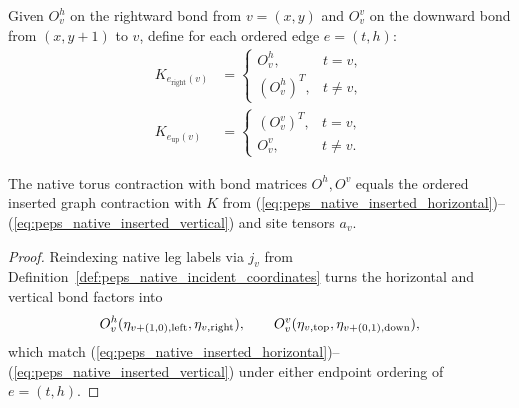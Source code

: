 \begin{definition}%
    \label{def:peps_native_inserted_matrices}
    \leanok
    Given $O^h_v$ on the rightward bond from $v=(x,y)$ and $O^v_v$ on the
    downward bond from $(x,y+1)$ to $v$, define for each ordered edge $e=(t,h)$:
    \begin{align}
        K_{e_{\mathrm{right}}(v)} & =
        \begin{cases}O^h_v,&t=v,\\(O^h_v)^T,&t\ne v,\end{cases}
        \label{eq:peps_native_inserted_horizontal} \\
        K_{e_{\mathrm{up}}(v)}    & =
        \begin{cases}(O^v_v)^T,&t=v,\\O^v_v,&t\ne v.\end{cases}
        \label{eq:peps_native_inserted_vertical}
    \end{align}
\end{definition}

\begin{lemma}%
    \label{thm:peps_native_inserted_network}
    \leanok
    The native torus contraction with bond matrices $O^h,O^v$ equals the ordered
    inserted graph contraction with $K$ from
    (\ref{eq:peps_native_inserted_horizontal})--(\ref{eq:peps_native_inserted_vertical})
    and site tensors $a_v$.
\end{lemma}
\begin{proof}\leanok
    Reindexing native leg labels via $j_v$ from
    Definition~\ref{def:peps_native_incident_coordinates} turns the horizontal
    and vertical bond factors into
    \begin{align}
        O^h_v(\eta_{v+(1,0),\mathrm{left}},\eta_{v,\mathrm{right}}),
        \qquad
        O^v_v(\eta_{v,\mathrm{top}},\eta_{v+(0,1),\mathrm{down}}),
        \notag
    \end{align}
    which match (\ref{eq:peps_native_inserted_horizontal})--(\ref{eq:peps_native_inserted_vertical})
    under either endpoint ordering of $e=(t,h)$.
\end{proof}

